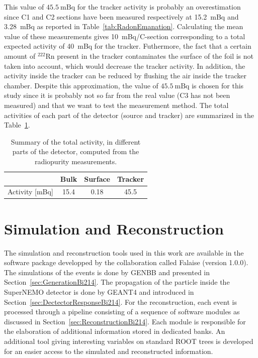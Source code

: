 \documentclass[main.tex]{subfiles}
\begin{document}
\NI This value of $\text{45.5}~\text{mBq}$ for the tracker activity is probably an overestimation since C1 and C2 sections have been measured respectively at 15.2~mBq and 3.28~mBq as reported in Table~\ref{tab:RadonEmanation}. Calculating the mean value of these measurements gives 10~mBq/C-section corresponding to a total expected activity of 40~mBq for the tracker. Futhermore, the fact that a certain amount of $^{\text{222}}$Rn present in the tracker contaminates the surface of the foil is not taken into account, which would decrease the tracker activity. In addition, the activity inside the tracker can be reduced by flushing the air inside the tracker chamber. Despite this approximation, the value of $\text{45.5}~\text{mBq}$ is chosen for this study since it is probably not so far from the real value (C3 has not been measured) and that we want to test the measurement method. The total activities of each part of the detector (source and tracker) are summarized in the Table~\ref{activity_measurement_different_parts}.


\begin{table}[h!]
\begin{center}
\begin{tabular}{c|c|c|c}
               & Bulk & Surface & Tracker \\[0.1cm]
\hline
Activity [mBq] & 15.4 & 0.18    & 45.5    \\[0.1cm]
\hline
\end{tabular}
\end{center}
\caption{Summary of the total activity, in different parts of the detector, computed from the radiopurity measurements.}
\label{activity_measurement_different_parts}
\end{table}



\section{Simulation and Reconstruction}\label{sec:SimuReco}


\noindent The simulation and reconstruction tools used in this work are available in the software package developped by the collaboration called Falaise (version 1.0.0). The simulations of the events is done by GENBB and presented in Section~\ref{sec:GenerationBi214}. The propagation of the particle inside the SuperNEMO detector is done by GEANT4 and introduced in Section~\ref{sec:DectectorResponseBi214}. For the reconstruction, each event is processed through a pipeline consisting of a sequence of software modules as discussed in Section~\ref{sec:ReconstructionBi214}. Each module is responsible for the elaboration of additional information stored in dedicated banks. An additional tool giving interesting variables on standard ROOT trees is developed for an easier access to the simulated and reconstructed information.
\end{document}
